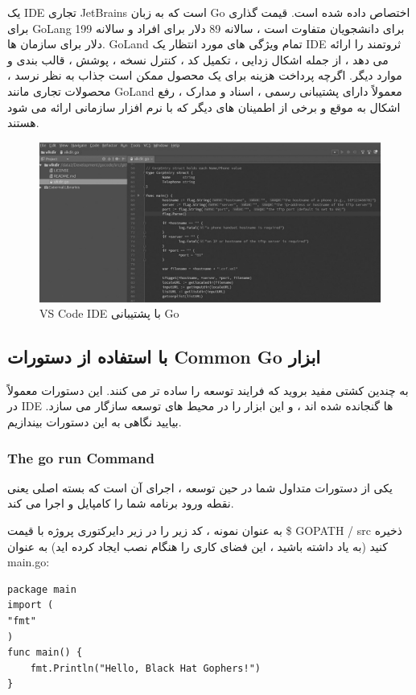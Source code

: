 \documentclass[12pt]{book}
\begin{document}
 یک IDE تجاری JetBrains است که به زبان Go اختصاص داده شده است.
قیمت گذاری برای GoLang برای دانشجویان متفاوت است ، سالانه 89 دلار برای افراد و سالانه 199 دلار برای سازمان ها.
GoLand تمام ویژگی های مورد انتظار یک IDE ثروتمند را ارائه می دهد ، از جمله اشکال زدایی ، تکمیل کد ، کنترل نسخه ، پوشش ، قالب بندی و موارد دیگر.
اگرچه پرداخت هزینه برای یک محصول ممکن است جذاب به نظر نرسد ، محصولات تجاری مانند GoLand معمولاً دارای پشتیبانی رسمی ، اسناد و مدارک ، رفع اشکال به موقع و برخی از اطمینان های دیگر که با نرم افزار سازمانی ارائه می شود هستند.
\begin{figure}
	\caption{VS Code IDE با پشتیبانی Go}
	\centering
	\includegraphics[width=1\textwidth]{images/goland.png}
\end{figure}
\subsection{با استفاده از دستورات Common Go ابزار}
به چندین کشتی مفید بروید که فرایند توسعه را ساده تر می کنند.
این دستورات معمولاً در IDE ها گنجانده شده اند ، و این ابزار را در محیط های توسعه سازگار می سازد. بیایید نگاهی به این دستورات بیندازیم.
\subsubsection{The go run Command}
یکی از دستورات متداول شما در حین توسعه ، اجرای آن است که بسته اصلی یعنی نقطه ورود برنامه شما را کامپایل و اجرا می کند.

به عنوان نمونه ، کد زیر را در زیر دایرکتوری پروژه با قیمت \$ GOPATH / src ذخیره کنید (به یاد داشته باشید ، این فضای کاری را هنگام نصب ایجاد کرده اید) به عنوان main.go:
\begin{latin}
	\begin{lstlisting}
package main
import (
"fmt"
)
func main() {
	fmt.Println("Hello, Black Hat Gophers!")
}
	\end{lstlisting}
\end{latin}
\end{document}
